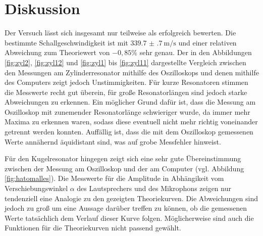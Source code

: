 \section{Diskussion}
\label{sec:Diskussion}

Der Versuch lässt sich insgesamt nur teilweise als erfolgreich bewerten. Die bestimmte
Schallgeschwindigkeit ist mit $\SI{339.7(7)}{\meter\per\second}$ und einer relativen Abweichung zum Theoriewert
von $-0{,}85\%$ sehr genau.
Der in den Abbildungen \ref{fig:zyl2}, \ref{fig:zyl12} und \ref{fig:zyl1} bis \ref{fig:zyl11}
dargestellte Vergleich zwischen den Messungen am Zylinderresonator mithilfe des Oszilloskops und denen mithilfe des
Computers zeigt jedoch Unstimmigkeiten. Für kurze Resonatoren stimmen die Messwerte recht
gut überein, für große Resonatorlängen sind jedoch starke Abweichungen zu erkennen. Ein möglicher
Grund dafür ist, dass die Messung am Oszilloskop mit zunemender Resonatorlänge schwieriger wurde,
da immer mehr Maxima zu erkennen waren, sodass diese eventuell nicht mehr richtig voneinander getrennt
werden konnten. Auffällig ist, dass die mit dem Oszilloskop gemessenen Werte annähernd
äquidistant sind, was auf grobe Messfehler hinweist.

Für den Kugelresonator hingegen zeigt sich eine sehr gute Übereinstimmung zwischen der Messung
am Oszilloskop und der am Computer (vgl. Abbildung \ref{fig:hatomalles}). Die Messwerte für die
Amplitude in Abhängikeit vom Verschiebungswinkel $\alpha$ des Lautsprechers und des Mikrophons
zeigen nur tendenziell eine Analogie zu den gezeigten Theoriekurven. Die Abweichungen sind
jedoch zu groß um eine Aussage darüber treffen zu können, ob die gemessenen Werte
tatsächlich dem Verlauf dieser Kurve folgen. Möglicherweise sind auch die Funktionen
für die Theoriekurven nicht passend gewählt.
